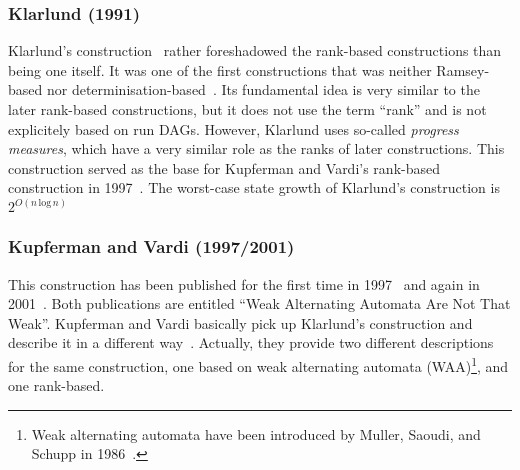 
\subsubsection{Klarlund (1991)}
\label{2_kla91}
Klarlund's construction~\cite{1991_klarlund} rather foreshadowed the rank-based constructions than being one itself. It was one of the first constructions that was neither Ramsey-based nor determinisation-based~\cite{1991_klarlund,Kupferman:2001}. Its fundamental idea is very similar to the later rank-based constructions, but it does not use the term ``rank'' and is not explicitely based on run DAGs. However, Klarlund uses so-called \textit{progress measures}, which have a very similar role as the ranks of later constructions. This construction served as the base for Kupferman and Vardi's rank-based construction in 1997~\cite{1997_vardi}. The worst-case state growth of Klarlund's construction is $2^{O(n\, \text{log}\, n)}$


\subsubsection{Kupferman and Vardi (1997/2001)}
\label{2_kv01}
This construction has been published for the first time in 1997~\cite{1997_vardi} and again in 2001~\cite{Kupferman:2001}. Both publications are entitled ``Weak Alternating Automata Are Not That Weak''. Kupferman and Vardi basically pick up Klarlund's construction and describe it in a different way~\cite{Kupferman:2001}. Actually, they provide two different descriptions for the same construction, one based on weak alternating automata (WAA)\footnote{Weak alternating automata have been introduced by Muller, Saoudi, and Schupp in 1986~\cite{1986_muller}.}, and one rank-based.


